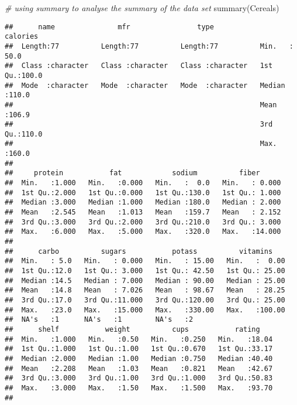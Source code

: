 \documentclass[
]{article}
\newenvironment{Shaded}{\begin{snugshade}}{\end{snugshade}}
\newcommand{\CommentTok}[1]{\textcolor[rgb]{0.56,0.35,0.01}{\textit{#1}}}
\newcommand{\FunctionTok}[1]{\textcolor[rgb]{0.00,0.00,0.00}{#1}}
\newcommand{\NormalTok}[1]{#1}
\begin{document}
\begin{Shaded}
\begin{Highlighting}[]
\CommentTok{\# using summary to analyse the summary of the data set}
\FunctionTok{summary}\NormalTok{(Cereals)}
\end{Highlighting}
\end{Shaded}

\begin{verbatim}
##      name               mfr                type              calories    
##  Length:77          Length:77          Length:77          Min.   : 50.0  
##  Class :character   Class :character   Class :character   1st Qu.:100.0  
##  Mode  :character   Mode  :character   Mode  :character   Median :110.0  
##                                                           Mean   :106.9  
##                                                           3rd Qu.:110.0  
##                                                           Max.   :160.0  
##                                                                          
##     protein           fat            sodium          fiber       
##  Min.   :1.000   Min.   :0.000   Min.   :  0.0   Min.   : 0.000  
##  1st Qu.:2.000   1st Qu.:0.000   1st Qu.:130.0   1st Qu.: 1.000  
##  Median :3.000   Median :1.000   Median :180.0   Median : 2.000  
##  Mean   :2.545   Mean   :1.013   Mean   :159.7   Mean   : 2.152  
##  3rd Qu.:3.000   3rd Qu.:2.000   3rd Qu.:210.0   3rd Qu.: 3.000  
##  Max.   :6.000   Max.   :5.000   Max.   :320.0   Max.   :14.000  
##                                                                  
##      carbo          sugars           potass          vitamins     
##  Min.   : 5.0   Min.   : 0.000   Min.   : 15.00   Min.   :  0.00  
##  1st Qu.:12.0   1st Qu.: 3.000   1st Qu.: 42.50   1st Qu.: 25.00  
##  Median :14.5   Median : 7.000   Median : 90.00   Median : 25.00  
##  Mean   :14.8   Mean   : 7.026   Mean   : 98.67   Mean   : 28.25  
##  3rd Qu.:17.0   3rd Qu.:11.000   3rd Qu.:120.00   3rd Qu.: 25.00  
##  Max.   :23.0   Max.   :15.000   Max.   :330.00   Max.   :100.00  
##  NA's   :1      NA's   :1        NA's   :2                        
##      shelf           weight          cups           rating     
##  Min.   :1.000   Min.   :0.50   Min.   :0.250   Min.   :18.04  
##  1st Qu.:1.000   1st Qu.:1.00   1st Qu.:0.670   1st Qu.:33.17  
##  Median :2.000   Median :1.00   Median :0.750   Median :40.40  
##  Mean   :2.208   Mean   :1.03   Mean   :0.821   Mean   :42.67  
##  3rd Qu.:3.000   3rd Qu.:1.00   3rd Qu.:1.000   3rd Qu.:50.83  
##  Max.   :3.000   Max.   :1.50   Max.   :1.500   Max.   :93.70  
## 
\end{verbatim}
\end{document}
